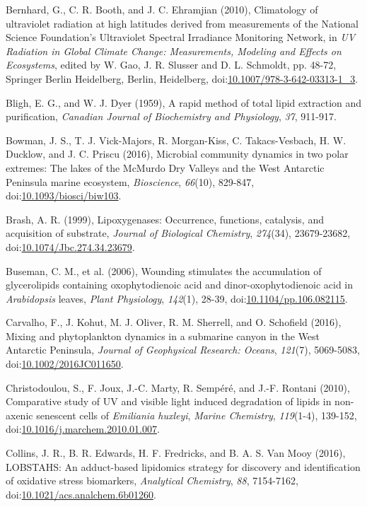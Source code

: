 \begin{singlespace}
{{Bernhard, G., C. R. Booth, and J. C. Ehramjian (2010), Climatology of ultraviolet radiation at high latitudes derived from measurements of the National Science Foundation's Ultraviolet Spectral Irradiance Monitoring Network, in \emph{UV Radiation in Global Climate Change: Measurements, Modeling and Effects on Ecosystems}, edited by W. Gao, J. R. Slusser and D. L. Schmoldt, pp. 48-72, Springer Berlin Heidelberg, Berlin, Heidelberg, doi:\href{http://dx.doi.org/10.1007/978-3-642-03313-1_3}{10.1007/978-3-642-03313-1\_3}.

Bligh, E. G., and W. J. Dyer (1959), A rapid method of total lipid extraction and purification, \emph{Canadian Journal of Biochemistry and Physiology}, \emph{37}, 911-917.

Bowman, J. S., T. J. Vick-Majors, R. Morgan-Kiss, C. Takacs-Vesbach, H. W. Ducklow, and J. C. Priscu (2016), Microbial community dynamics in two polar extremes: The lakes of the McMurdo Dry Valleys and the West Antarctic Peninsula marine ecosystem, \emph{Bioscience}, \emph{66}(10), 829-847, doi:\href{http://dx.doi.org/10.1093/biosci/biw103}{10.1093/biosci/biw103}.

Brash, A. R. (1999), Lipoxygenases: Occurrence, functions, catalysis, and acquisition of substrate, \emph{Journal of Biological Chemistry}, \emph{274}(34), 23679-23682, doi:\href{http://dx.doi.org/10.1074/Jbc.274.34.23679}{10.1074/Jbc.274.34.23679}.

Buseman, C. M., et al. (2006), Wounding stimulates the accumulation of glycerolipids containing oxophytodienoic acid and dinor-oxophytodienoic acid in \emph{Arabidopsis} leaves, \emph{Plant Physiology}, \emph{142}(1), 28-39, doi:\href{http://dx.doi.org/10.1104/pp.106.082115}{10.1104/pp.106.082115}.

Carvalho, F., J. Kohut, M. J. Oliver, R. M. Sherrell, and O. Schofield (2016), Mixing and phytoplankton dynamics in a submarine canyon in the West Antarctic Peninsula, \emph{Journal of Geophysical Research: Oceans}, \emph{121}(7), 5069-5083, doi:\href{http://dx.doi.org/10.1002/2016JC011650}{10.1002/2016JC011650}.

Christodoulou, S., F. Joux, J.-C. Marty, R. Semp\'{e}r\'{e}, and J.-F. Rontani (2010), Comparative study of UV and visible light induced degradation of lipids in non-axenic senescent cells of \emph{Emiliania huxleyi}, \emph{Marine Chemistry}, \emph{119}(1-4), 139-152, doi:\href{http://dx.doi.org/10.1016/j.marchem.2010.01.007}{10.1016/j.marchem.2010.01.007}.

Collins, J. R., B. R. Edwards, H. F. Fredricks, and B. A. S. Van Mooy (2016), LOBSTAHS: An adduct-based lipidomics strategy for discovery and identification of oxidative stress biomarkers, \emph{Analytical Chemistry}, \emph{88}, 7154-7162, doi:\href{http://dx.doi.org/10.1021/acs.analchem.6b01260}{10.1021/acs.analchem.6b01260}.

}}
\end{singlespace}
